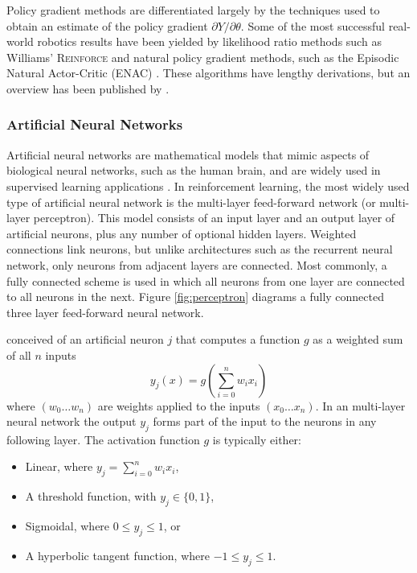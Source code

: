 Policy gradient methods are differentiated largely by the techniques used to
obtain an estimate of the policy gradient $\partial Y / \partial \theta$. Some
of the most successful real-world robotics results \cite{glynn87,aleksandrov68}
have been yielded by likelihood ratio methods such as Williams'
\textsc{Reinforce} \cite{williams:reinforce} and natural policy gradient
methods, such as the Episodic Natural Actor-Critic (ENAC) \cite{peters:enac}.
These algorithms have lengthy derivations, but an overview has been published
by .

\subsubsection{Artificial Neural Networks}
Artificial neural networks are mathematical models that mimic aspects of
biological neural networks, such as the human brain, and are widely used in
supervised learning applications \cite{bishop96ann,fausett94}.
In reinforcement learning, the most widely used type of artificial neural
network is the multi-layer feed-forward network (or multi-layer perceptron).
This model consists of an input layer and an output layer of artificial neurons,
plus any number of optional hidden layers.  Weighted connections link
neurons, but unlike architectures such as the recurrent neural network, only
neurons from adjacent layers are connected.  Most commonly, a fully connected
scheme is used in which all neurons from one layer are connected to all neurons in the
next.  Figure \ref{fig:perceptron} diagrams a fully connected three layer
feed-forward neural network.


 conceived of an artificial neuron $j$ that
computes a function $g$ as a weighted sum of all $n$ inputs
\begin{equation}
y_j(x) = g \left(\sum_{i=0}^n w_ix_i\right)
\end{equation}
where $(w_0 \dotsc w_n)$ are weights applied to the inputs $(x_0 \dotsc x_n)$.
In an multi-layer neural network the output $y_j$ forms part of the input
to the neurons in any following layer.  The activation function $g$ is
typically either:
\begin{itemize}
  \item Linear, where $y_j = \sum_{i=0}^n w_ix_i$,
  \item A threshold function, with $y_j \in \lbrace 0,1 \rbrace$,
  \item Sigmoidal, where $0 \leq y_j \leq 1$, or
  \item A hyperbolic tangent function, where $-1 \leq y_j \leq 1$.
\end{itemize}


